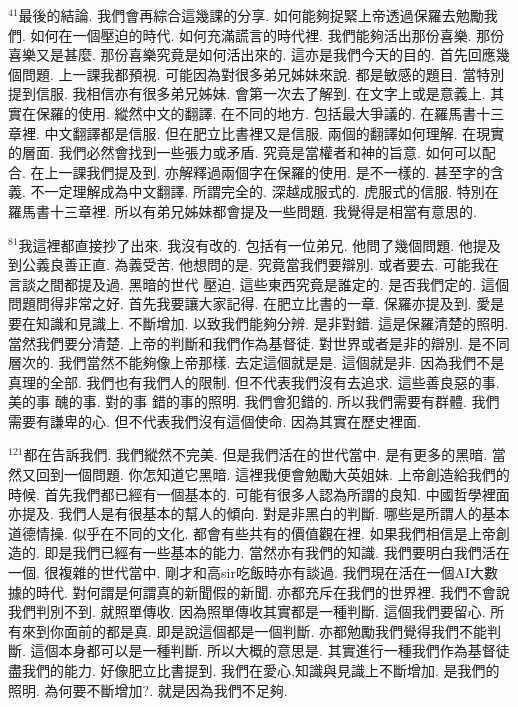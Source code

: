 \documentclass{book}
\begin{document}
$^{41}$最後的結論.
我們會再綜合這幾課的分享.
如何能夠捉緊上帝透過保羅去勉勵我們.
如何在一個壓迫的時代.
如何充滿謊言的時代裡.
我們能夠活出那份喜樂.
那份喜樂又是甚麼.
那份喜樂究竟是如何活出來的.
這亦是我們今天的目的.
首先回應幾個問題.
上一課我都預視.
可能因為對很多弟兄姊妹來說.
都是敏感的題目.
當特別提到信服.
我相信亦有很多弟兄姊妹.
會第一次去了解到.
在文字上或是意義上.
其實在保羅的使用.
縱然中文的翻譯.
在不同的地方.
包括最大爭議的.
在羅馬書十三章裡.
中文翻譯都是信服.
但在肥立比書裡又是信服.
兩個的翻譯如何理解.
在現實的層面.
我們必然會找到一些張力或矛盾.
究竟是當權者和神的旨意.
如何可以配合.
在上一課我們提及到.
亦解釋過兩個字在保羅的使用.
是不一樣的.
甚至字的含義.
不一定理解成為中文翻譯.
所謂完全的.
深越成服式的.
虎服式的信服.
特別在羅馬書十三章裡.
所以有弟兄姊妹都會提及一些問題.
我覺得是相當有意思的.

$^{81}$我這裡都直接抄了出來.
我沒有改的.
包括有一位弟兄.
他問了幾個問題.
他提及到公義良善正直.
為義受苦.
他想問的是.
究竟當我們要辯別.
或者要去.
可能我在言談之間都提及過.
黑暗的世代 壓迫.
這些東西究竟是誰定的.
是否我們定的.
這個問題問得非常之好.
首先我要讓大家記得.
在肥立比書的一章.
保羅亦提及到.
愛是要在知識和見識上.
不斷增加.
以致我們能夠分辨.
是非對錯.
這是保羅清楚的照明.
當然我們要分清楚.
上帝的判斷和我們作為基督徒.
對世界或者是非的辯別.
是不同層次的.
我們當然不能夠像上帝那樣.
去定這個就是是.
這個就是非.
因為我們不是真理的全部.
我們也有我們人的限制.
但不代表我們沒有去追求.
這些善良惡的事.
美的事 醜的事.
對的事 錯的事的照明.
我們會犯錯的.
所以我們需要有群體.
我們需要有謙卑的心.
但不代表我們沒有這個使命.
因為其實在歷史裡面.

$^{121}$都在告訴我們.
我們縱然不完美.
但是我們活在的世代當中.
是有更多的黑暗.
當然又回到一個問題.
你怎知道它黑暗.
這裡我便會勉勵大英姐妹.
上帝創造給我們的時候.
首先我們都已經有一個基本的.
可能有很多人認為所謂的良知.
中國哲學裡面亦提及.
我們人是有很基本的幫人的傾向.
對是非黑白的判斷.
哪些是所謂人的基本道德情操.
似乎在不同的文化.
都會有些共有的價值觀在裡.
如果我們相信是上帝創造的.
即是我們已經有一些基本的能力.
當然亦有我們的知識.
我們要明白我們活在一個.
很複雜的世代當中.
剛才和高sir吃飯時亦有談過.
我們現在活在一個AI大數據的時代.
對何謂是何謂真的新聞假的新聞.
亦都充斥在我們的世界裡.
我們不會說我們判別不到.
就照單傳收.
因為照單傳收其實都是一種判斷.
這個我們要留心.
所有來到你面前的都是真.
即是說這個都是一個判斷.
亦都勉勵我們覺得我們不能判斷.
這個本身都可以是一種判斷.
所以大概的意思是.
其實進行一種我們作為基督徒盡我們的能力.
好像肥立比書提到.
我們在愛心,知識與見識上不斷增加.
是我們的照明.
為何要不斷增加?.
就是因為我們不足夠.
\end{document}
